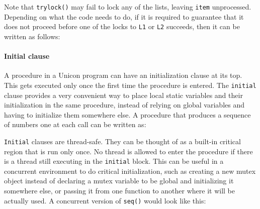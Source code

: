 Note that \texttt{trylock()} may fail to lock any of the lists, leaving
\texttt{item} unprocessed. Depending on what the code needs to do, if it is
required to guarantee that it does not proceed before one of the locks to
\texttt{L1} or \texttt{L2} succeeds, then it can be written as follows:


\paragraph{Initial clause}

A procedure in a Unicon program can have an initialization clause at its top.
This gets executed only once the first time the procedure is entered. The
\texttt{initial} clause provides a very convenient way to place local static
variables and their initialization in the same procedure, instead of relying on
global variables and having to initialize them somewhere else.  A procedure that
produces a sequence of numbers one at each call can be written as:


\texttt{Initial} clauses are thread-safe. They can be thought of as a built-in
critical region that is run only once. No thread is allowed to enter the
procedure if there is a thread still executing in the \texttt{initial}
block. This can be useful in a concurrent environment to do critical
initialization, such as creating a new mutex object instead of declaring a mutex
variable to be global and initializing it somewhere else, or passing it from one
function to another where it will be actually used.  A concurrent version of
\texttt{seq()} would look like this:


